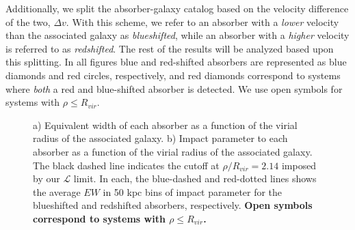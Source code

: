 \documentclass[twocolumn,tighten]{aastex6}
\begin{document}
Additionally, we split the absorber-galaxy catalog based on the velocity difference of the two, $\Delta v$. With this scheme, we refer to an absorber with a \textit{lower} velocity than the associated galaxy as \textit{blueshifted}, while an absorber with a \textit{higher} velocity is referred to as \textit{redshifted}. The rest of the results will be analyzed based upon this splitting. In all figures blue and red-shifted absorbers are represented as blue diamonds and red circles, respectively, and red diamonds correspond to systems where \textit{both} a red and blue-shifted absorber is detected. We use open symbols for systems with $\rho \leq R_{vir}$.


\begin{figure}[ht]
\centering
{}
\caption{\small{a) Equivalent width of each absorber as a function of the virial radius of the associated galaxy. b) Impact parameter to each absorber as a function of the virial radius of the associated galaxy. The black dashed line indicates the cutoff at $\rho/R_{vir} =2.14$ imposed by our $\mathcal{L}$ limit.} In each, the blue-dashed and red-dotted lines shows the average $EW$ in 50 kpc bins of impact parameter for the blueshifted and redshifted absorbers, respectively. \textbf{Open symbols correspond to systems with $\rho \leq R_{vir}$.}}
\vspace{5pt}
\end{figure}
\end{document}
